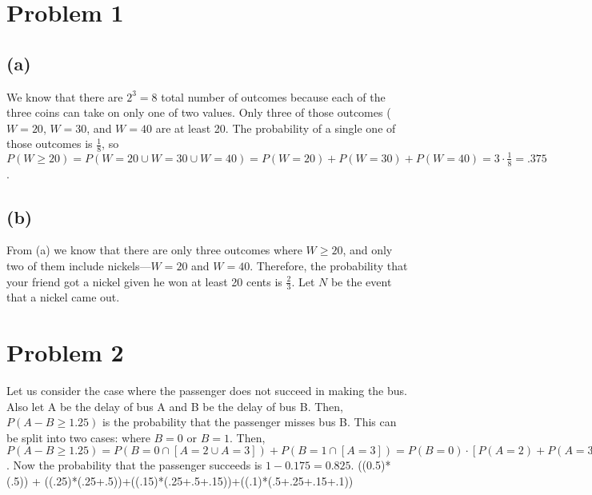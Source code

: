 \documentclass{article}
\begin{document}
\thispagestyle{fancy}

\list{} \item \endlist

\section*{Problem 1} 

\subsection*{(a)}

We know that there are $2^{3} = 8$ total number of outcomes because each of the
three coins can take on only one of two values. Only three of those outcomes
($W = 20$, $W = 30$, and $W=40$ are at least 20. The probability of a single
one of those outcomes is $\frac{1}{8}$, so $P(W \geq 20)=P( W = 20 \cup W=30
\cup W=40 )=P( W = 20 ) + P( W = 30 ) + P( W = 40 ) = 3 \cdot \frac{1}{8} =
.375$.

\subsection*{(b)}

From (a) we know that there are only three outcomes where $W \geq 20$, and only
two of them include nickels---$W = 20$ and $W = 40$. Therefore, the probability
that your friend got a nickel given he won at least 20 cents is $\frac{2}{3}$.
Let $N$ be the event that a nickel came out.

\section*{Problem 2}

Let us consider the case where the passenger does not succeed in making the
bus. Also let A be the delay of bus A and B be the delay of bus B. Then, $P(A -
B \geq 1.25)$ is the probability that the passenger misses bus B. This can be
split into two cases: where $B = 0$ or $B = 1$. Then, $P( A - B \geq 1.25 ) =
P( B = 0 \cap [A = 2 \cup A = 3] ) + P( B = 1 \cap [A = 3]) = P(B=0)\cdot [P(A
= 2 ) + P( A = 3 ) ] + P(B=1)\cdot P(A = 3 ) = 0.5\cdot (0.15 + 0.1) + 0.5\cdot
0.1 = 0.175$. Now the probability that the passenger succeeds is $1 - 0.175 =
0.825$.
((0.5)*(.5)) + ((.25)*(.25+.5))+((.15)*(.25+.5+.15))+((.1)*(.5+.25+.15+.1))
\end{document}
